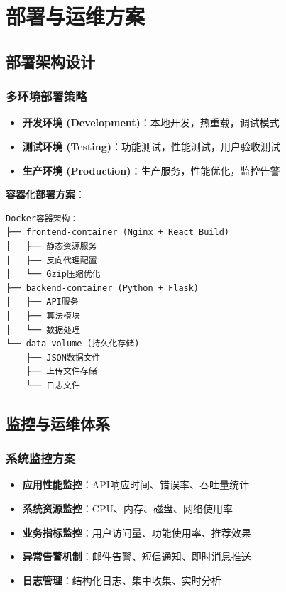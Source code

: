 \documentclass[12pt,a4paper]{article}
\begin{document}
\section{部署与运维方案}

\subsection{部署架构设计}

\subsubsection{多环境部署策略}

\begin{infobox}[title={三环境部署架构}]
\begin{itemize}[nosep]
    \item \textbf{开发环境 (Development)}：本地开发，热重载，调试模式
    \item \textbf{测试环境 (Testing)}：功能测试，性能测试，用户验收测试
    \item \textbf{生产环境 (Production)}：生产服务，性能优化，监控告警
\end{itemize}
\end{infobox}

\textbf{容器化部署方案}：
\begin{verbatim}
Docker容器架构：
├── frontend-container (Nginx + React Build)
│   ├── 静态资源服务
│   ├── 反向代理配置
│   └── Gzip压缩优化
├── backend-container (Python + Flask)
│   ├── API服务
│   ├── 算法模块
│   └── 数据处理
└── data-volume (持久化存储)
    ├── JSON数据文件
    ├── 上传文件存储
    └── 日志文件
\end{verbatim}

\subsection{监控与运维体系}

\subsubsection{系统监控方案}

\begin{solutionbox}[title={全方位监控体系}]
\begin{itemize}[nosep]
    \item \textbf{应用性能监控}：API响应时间、错误率、吞吐量统计
    \item \textbf{系统资源监控}：CPU、内存、磁盘、网络使用率
    \item \textbf{业务指标监控}：用户访问量、功能使用率、推荐效果
    \item \textbf{异常告警机制}：邮件告警、短信通知、即时消息推送
    \item \textbf{日志管理}：结构化日志、集中收集、实时分析
\end{itemize}
\end{solutionbox}
\end{document}
